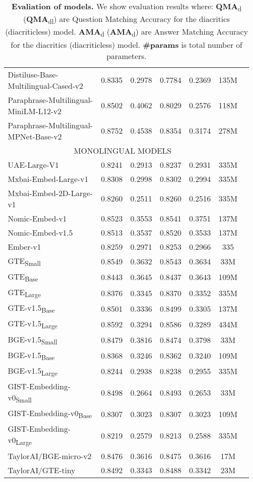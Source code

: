 \begin{table}[ht!]
\begin{tabular}{lcccccc}
    Distiluse-Base-Multilingual-Cased-v2 & 0.8335 & 0.2978 & 0.7784 & 0.2369 & 135M \\
    Paraphrase-Multilingual-MiniLM-L12-v2 & 0.8502 & 0.4062 & 0.8029 & 0.2576 & 118M \\
    Paraphrase-Multilingual-MPNet-Base-v2 & 0.8752 & 0.4538 & 0.8354 & 0.3174 & 278M \\
    \hline
    \multicolumn{6}{c}{MONOLINGUAL MODELS} \\
    \hline
    UAE-Large-V1 & 0.8241 & 0.2913 & 0.8237 & 0.2931 & 335M \\
    Mxbai-Embed-Large-v1 & 0.8308 & 0.2998 & 0.8302 & 0.2994 & 335M \\
    Mxbai-Embed-2D-Large-v1 & 0.8260 & 0.2511 & 0.8260 & 0.2516 & 335M \\
    Nomic-Embed-v1 & 0.8523 & 0.3553 & 0.8541 & 0.3751 & 137M \\
    Nomic-Embed-v1.5 & 0.8513 & 0.3537 & 0.8520 & 0.3533 & 137M \\
    Ember-v1 & 0.8259 & 0.2971 & 0.8253 & 0.2966 & 335 \\
    GTE\textsubscript{Small} & 0.8549 & 0.3632 & 0.8543 & 0.3634 & 33M \\
    GTE\textsubscript{Base} & 0.8443 & 0.3645 & 0.8437 & 0.3643 & 109M \\
    GTE\textsubscript{Large} & 0.8376 & 0.3345 & 0.8370 & 0.3352 & 335M \\
    GTE-v1.5\textsubscript{Base} & 0.8501 & 0.3336 & 0.8499 & 0.3305 & 137M \\
    GTE-v1.5\textsubscript{Large} & 0.8592 & 0.3294 & 0.8586 & 0.3289 & 434M \\
    BGE-v1.5\textsubscript{Small} & 0.8479 & 0.3816 & 0.8474 & 0.3798 & 33M \\
    BGE-v1.5\textsubscript{Base} & 0.8368 & 0.3246 & 0.8362 & 0.3240 & 109M \\
    BGE-v1.5\textsubscript{Large} & 0.8244 & 0.2938 & 0.8238 & 0.2955 & 335M \\
    GIST-Embedding-v0\textsubscript{Small} & 0.8498 & 0.2664 & 0.8493 & 0.2653 & 33M \\
    GIST-Embedding-v0\textsubscript{Base} & 0.8307 & 0.3023 & 0.8307 & 0.3023 & 109M \\
    GIST-Embedding-v0\textsubscript{Large} & 0.8219 & 0.2579 & 0.8213 & 0.2588 & 335M \\
    TaylorAI/BGE-micro-v2 & 0.8476 & 0.3616 & 0.8475 & 0.3616 & 17M \\
    TaylorAI/GTE-tiny & 0.8492 & 0.3343 & 0.8488 & 0.3342 & 23M \\
    \bottomrule
  \end{tabular}
  \caption{\textbf{Evaliation of models.}
    We show evaluation results where:
    \textbf{QMA}\textsubscript{d} (\textbf{QMA}\textsubscript{dl}) are Question Matching Accuracy for the diacritics (diacriticless) model.
    \textbf{AMA}\textsubscript{d} (\textbf{AMA}\textsubscript{d}) are Answer Matching Accuracy for the diacritics (diacriticless) model.
    \textbf{\#params} is total number of parameters.}
  \label{tab:evaluatinon}
\end{table}
  